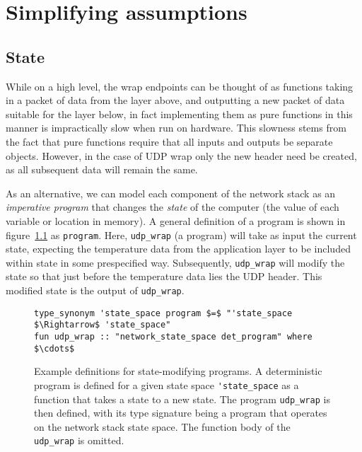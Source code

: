 \documentclass[twoside]{memoir}
\begin{document}

\chapter{Simplifying assumptions}
\section{State}
While on a high level, the wrap endpoints can be thought of as
functions taking in a packet of data from the layer above, and outputting a 
new packet of data suitable for the layer below,
in fact implementing them as pure functions in this manner
is impractically slow when run on hardware.
This slowness stems from the fact that pure functions require that all inputs and outputs be
separate objects.
However, in the case of UDP wrap only the new header need be created,
as all subsequent data will remain the same.

As an alternative, we can model each component of the network stack
as an \textit{imperative program} that changes the \textit{state} of the computer
(the value of each variable or location in memory). %
A general definition of a program is shown in figure~\ref{fig:prog-def-det-nondet} as \lstinline{program}.
Here, \lstinline{udp_wrap} (a program) will take as input the current state,
expecting the temperature data from the application layer to be included within state in some prespecified way.
Subsequently, \lstinline{udp_wrap} will modify the state so that just before the
temperature data lies the UDP header.
This modified state is the output of \lstinline{udp_wrap}.

\begin{figure}[htb]
    \centering
\begin{lstlisting}[language=isabelle]
type_synonym 'state_space program $=$ "'state_space $\Rightarrow$ 'state_space"
fun udp_wrap :: "network_state_space det_program" where $\cdots$
\end{lstlisting}
    \caption{Example definitions for state-modifying programs.
    A deterministic program is defined for a
    given state space \lstinline{'state_space}
    as a function that takes a state to a new state.
    The program \lstinline{udp_wrap} is then defined, with its type signature
    being a program that operates on the network stack state space.
    The function body of the \lstinline{udp_wrap} is omitted.
    }
    \label{fig:prog-def-det-nondet}
\end{figure}
\end{document}

